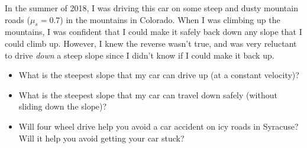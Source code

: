 \documentclass[12pt]{article}
\begin{document}
\begin{enumerate}
In the summer of 2018, I was driving this car on some steep and dusty mountain roads ($\mu_s = 0.7$) in the mountains in Colorado. When I was climbing up the mountains, I was confident that I could make it safely back down any slope that I could 
climb up. However, I knew the reverse wasn't true, and was very reluctant to drive {\it down} a steep slope since
I didn't know if I could make it back up.

\begin{itemize}
\item What is the steepest slope that my car can drive up (at a constant velocity)?
\item What is the steepest slope that my car can travel down safely (without sliding down the slope)?
\item Will four wheel drive help you avoid a car accident on icy roads in Syracuse? Will it help you avoid getting your 
car stuck?
\end{itemize}



    \end{enumerate}
\end{document}
